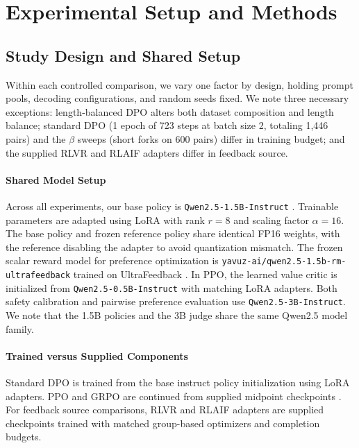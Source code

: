 \documentclass{article}
\begin{document}
\section{Experimental Setup and Methods}
\label{sec:setup}

\subsection{Study Design and Shared Setup}
\label{sec:setup_preface}

Within each controlled comparison, we vary one factor by design, holding prompt pools, decoding configurations, and random seeds fixed. We note three necessary exceptions: length-balanced DPO alters both dataset composition and length balance; standard DPO (1 epoch of 723 steps at batch size 2, totaling 1,446 pairs) and the $\beta$ sweeps (short forks on 600 pairs) differ in training budget; and the supplied RLVR and RLAIF adapters differ in feedback source.

\paragraph{Shared Model Setup} Across all experiments, our base policy is \texttt{Qwen2.5-1.5B-Instruct} \citep{qwen2025qwen25}. Trainable parameters are adapted using LoRA \citep{hu2022lora} with rank $r = 8$ and scaling factor $\alpha = 16$. The base policy and frozen reference policy share identical FP16 weights, with the reference disabling the adapter to avoid quantization mismatch. The frozen scalar reward model for preference optimization is \texttt{yavuz-ai/qwen2.5-1.5b-rm-ultrafeedback} trained on UltraFeedback \citep{cui2024ultrafeedback}. In PPO, the learned value critic is initialized from \texttt{Qwen2.5-0.5B-Instruct} with matching LoRA adapters. Both safety calibration and pairwise preference evaluation use \texttt{Qwen2.5-3B-Instruct}. We note that the 1.5B policies and the 3B judge share the same Qwen2.5 model family.

\paragraph{Trained versus Supplied Components} Standard DPO is trained from the base instruct policy initialization using LoRA adapters. PPO and GRPO are continued from supplied midpoint checkpoints \citep{atmlpa2starter, atmlpa2assets}. For feedback source comparisons, RLVR and RLAIF adapters are supplied checkpoints trained with matched group-based optimizers and completion budgets.
\end{document}
